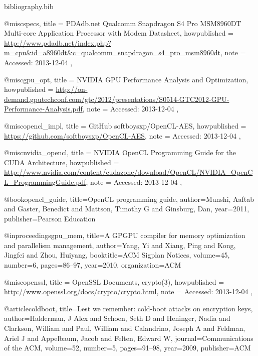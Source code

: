 \documentclass[conference,10pt]{IEEEtran}
\begin{document}
\begin{filecontents*}{bibliography.bib}

    @misc{specs,
        title = {{PDAdb.net} Qualcomm Snapdragon S4 Pro MSM8960DT Multi-core Application Processor 
        with Modem Datasheet},
        howpublished = 
        {\url{http://www.pdadb.net/index.php?m=cpu&id=a8960dt&c=qualcomm_snapdragon_s4_pro_msm8960dt}},
        note = {Accessed: 2013-12-04}
    },

    @misc{gpu_opt,
        title = {{NVIDIA} GPU Performance Analysis and Optimization},
        howpublished = 
        {\url{http://on-demand.gputechconf.com/gtc/2012/presentations/S0514-GTC2012-GPU-Performance-Analysis.pdf}},
        note = {Accessed: 2013-12-04}
    },

    @misc{opencl_impl,
        title = {{GitHub} softboysxp/OpenCL-AES},
        howpublished = {\url{https://github.com/softboysxp/OpenCL-AES}},
        note = {Accessed: 2013-12-04}
    },

    @misc{nvidia_opencl,
        title = {{NVIDIA} OpenCL Programming Guide for the CUDA Architecture},
        howpublished = 
        {\url{http://www.nvidia.com/content/cudazone/download/OpenCL/NVIDIA_OpenCL_ProgrammingGuide.pdf}},
        note = {Accessed: 2013-12-04}
    },

    @book{opencl_guide,
        title={OpenCL programming guide},
        author={Munshi, Aaftab and Gaster, Benedict and Mattson, Timothy G and Ginsburg, Dan},
        year={2011},
        publisher={Pearson Education}
    }

    @inproceedings{gpu_mem,
        title={A GPGPU compiler for memory optimization and parallelism management},
        author={Yang, Yi and Xiang, Ping and Kong, Jingfei and Zhou, Huiyang},
        booktitle={ACM Sigplan Notices},
        volume={45},
        number={6},
        pages={86--97},
        year={2010},
        organization={ACM}
    }

    @misc{openssl,
        title = {{OpenSSL} Documents, crypto(3)},
        howpublished = {\url{http://www.openssl.org/docs/crypto/crypto.html}},
        note = {Accessed: 2013-12-04}
    },

    @article{coldboot,
        title={Lest we remember: cold-boot attacks on encryption keys},
        author={Halderman, J Alex and Schoen, Seth D and Heninger, Nadia and Clarkson, William and Paul, William and Calandrino, Joseph A and Feldman, Ariel J and Appelbaum, Jacob and Felten, Edward W},
        journal={Communications of the ACM},
        volume={52},
        number={5},
        pages={91--98},
        year={2009},
        publisher={ACM}
    }


\end{filecontents*}
\end{document}
